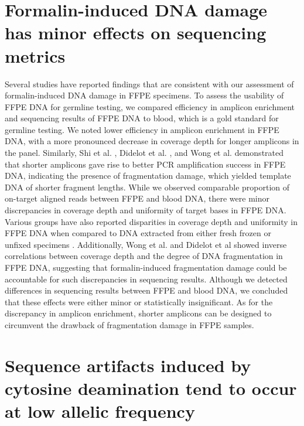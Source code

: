 \section{Formalin-induced DNA damage has minor effects on sequencing metrics}
\label{sec:Formalin-inducedDNAdamagehasminoreffectsonsequencingmetrics}

Several studies have reported findings that are consistent with our assessment of formalin-induced DNA damage in FFPE specimens. To assess the usability of FFPE DNA for germline testing, we compared efficiency in amplicon enrichment and sequencing results of FFPE DNA to blood, which is a gold standard for germline testing. We noted lower efficiency in amplicon enrichment in FFPE DNA, with a more pronounced decrease in coverage depth for longer amplicons in the panel. Similarly, Shi et al. \cite{Shi2002}, Didelot et al. \cite{Didelot2013}, and Wong et al. \cite{Wong2013} demonstrated that shorter amplicons gave rise to better PCR amplification success in FFPE DNA, indicating the presence of fragmentation damage, which yielded template DNA of shorter fragment lengths. While we observed comparable proportion of on-target aligned reads between FFPE and blood DNA, there were minor discrepancies in coverage depth and uniformity of target bases in FFPE DNA. Various groups have also reported disparities in coverage depth and uniformity in FFPE DNA when compared to DNA extracted from either fresh frozen or unfixed specimens \cite{Wong2013, Betge2015, Spencer2013}. Additionally, Wong et al. \cite{Wong2014} and Didelot et al \cite{Didelot2013} showed inverse correlations between coverage depth and the degree of DNA fragmentation in FFPE DNA, suggesting that formalin-induced fragmentation damage could be accountable for such discrepancies in sequencing results. Although we detected differences in sequencing results between FFPE and blood DNA, we concluded that these effects were either minor or statistically insignificant. As for the discrepancy in amplicon enrichment, shorter amplicons can be designed to circumvent the drawback of fragmentation damage in FFPE samples.

\section{Sequence artifacts induced by cytosine deamination tend to occur at low allelic frequency}
\label{sec:Sequenceartifactsinducedbycytosinedeaminationtendtooccuratlowallelicfrequency}

